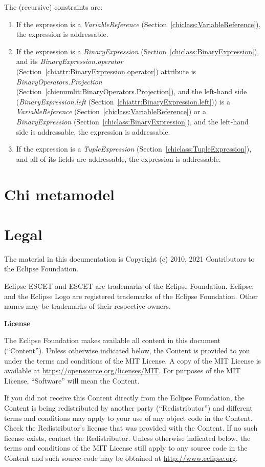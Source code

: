 \documentclass{report}
\newcommand{\chiclass}[1]{\textit{#1} (Section~\ref{chiclass:#1})}
\newcommand{\chiattr}[1]{\textit{#1} (Section~\ref{chiattr:#1})}
\newcommand{\chienumlit}[1]{\textit{#1} (Section~\ref{chienumlit:#1})}
\begin{document}
The (recursive) constraints are:
\begin{enumerate}
\item If the expression is a \chiclass{VariableReference}, the expression is
    addressable.
\item If the expression is a \chiclass{BinaryExpression}, and its
    \chiattr{BinaryExpression.operator} attribute is
    \chienumlit{BinaryOperators.Projection}, and the left-hand side
    (\chiattr{BinaryExpression.left}) is a \chiclass{VariableReference} or a
    \chiclass{BinaryExpression}, and the left-hand side is addressable,
    the expression is addressable.
\item If the expression is a \chiclass{TupleExpression}, and all of its
    fields are addressable, the expression is addressable.
\end{enumerate}


\chapter{Chi metamodel}





\chapter{Legal}

The material in this documentation is
Copyright (c) 2010, 2021 Contributors to the Eclipse Foundation.

Eclipse ESCET and ESCET are trademarks of the Eclipse Foundation.
Eclipse, and the Eclipse Logo are registered trademarks of the
Eclipse Foundation. Other names may be trademarks of their
respective owners.

\textbf{License}

The Eclipse Foundation makes available all content in this document
(``Content''). Unless otherwise indicated below, the Content is provided to you
under the terms and conditions of the MIT License. A copy of the MIT License
is available at \url{https://opensource.org/licenses/MIT}. For purposes of the
MIT License, ``Software'' will mean the Content.

If you did not receive this Content directly from the Eclipse Foundation,
the Content is being redistributed by another party (``Redistributor'') and
different terms and conditions may apply to your use of any object code in
the Content. Check the Redistributor's license that was provided with the
Content. If no such license exists, contact the Redistributor. Unless
otherwise indicated below, the terms and conditions of the MIT License
still apply to any source code in the Content and such source code may be
obtained at \url{http://www.eclipse.org}.





\end{document}
